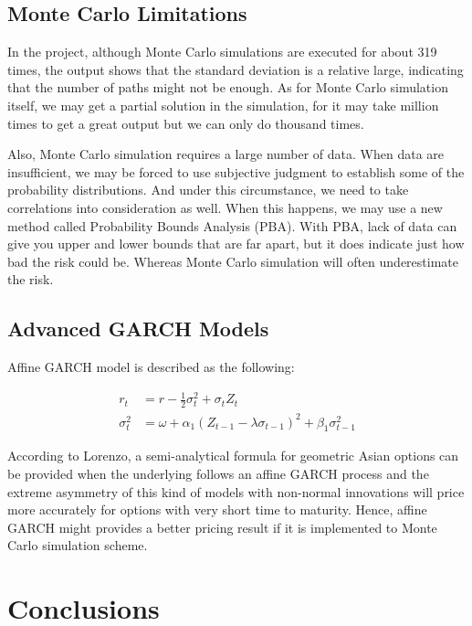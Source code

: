 \documentclass[10pt, a4paper, twocolumn]{article} %
\begin{document}
\subsection{Monte Carlo Limitations}

In the project, although Monte Carlo simulations are executed for about 319 times, the output shows that the standard deviation is a relative large, indicating that the number of paths might not be enough.  As for Monte Carlo simulation itself, we may get a partial solution in the simulation, for it may take million times to get a great output but we can only do thousand times.

Also, Monte Carlo simulation requires a large number of data. When data are insufficient, we may be forced to use subjective judgment to establish some of the probability distributions. And under this circumstance, we need to take correlations into consideration as well. When this happens, we may use a new method called Probability Bounds Analysis (PBA). With PBA, lack of data can give you upper and lower bounds that are far apart, but it does indicate just how bad the risk could be. Whereas Monte Carlo simulation will often underestimate the risk.

\subsection{Advanced GARCH Models}

Affine GARCH model is described as the following:

\begin{equation}
\begin{aligned}
r_t &= r - \frac 12 \sigma_t^2 + \sigma_t Z_t
\\
\sigma_t^2 &= \omega + \alpha_1 (Z_{t-1} -\lambda \sigma_{t-1})^2+\beta_1 \sigma_{t-1}^2
\end{aligned}
\end{equation}

According to Lorenzo, a semi-analytical formula for geometric Asian options can be provided when the underlying follows an affine GARCH process and the extreme asymmetry of this kind of models with non-normal innovations will price more accurately for options with very short time to maturity\citep{lorenzo2011pricing}. Hence, affine GARCH might provides a better pricing result if it is implemented to Monte Carlo simulation scheme.



\section{Conclusions}
\end{document}
